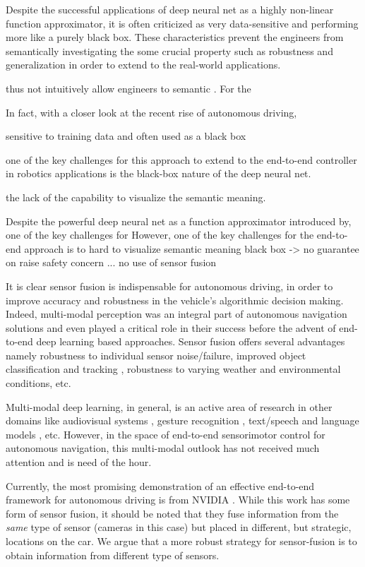 \documentclass[../thesis.tex]{subfiles}
\begin{document}
Despite the successful applications of deep neural net as a highly non-linear function approximator, it is often criticized as very data-sensitive and performing more like a purely black box. These characteristics prevent the engineers from semantically investigating the some crucial property such as robustness and generalization in order to extend 
to the real-world applications.


thus not intuitively allow engineers to semantic 
. For the 

In fact, with a closer look at the recent rise of autonomous driving, 

sensitive to training data and often used as a black box 

one of the key challenges for this approach to extend to the end-to-end controller in robotics applications is the black-box nature of the deep neural net.

the lack of the capability to visualize the semantic meaning. 

Despite the powerful deep neural net as a function approximator introduced by, one of the key challenges for 
However, one of the key challenges for the end-to-end approach is to 
hard to visualize semantic meaning 
black box -> no guarantee on 
raise safety concern ... 
no use of sensor fusion

It is clear sensor fusion is indispensable for autonomous driving, in order to improve accuracy and robustness in the vehicle's algorithmic decision making. Indeed, multi-modal perception was an integral part of autonomous navigation solutions and even played a critical role in their success \cite{multimodaltartan} before the advent of end-to-end deep learning based approaches. Sensor fusion offers several advantages namely robustness to individual sensor noise/failure, improved object classification and tracking \cite{elfring2016multisensor, cho2014multi, darms2008classification}, robustness to varying weather and environmental conditions, etc. 

Multi-modal deep learning, in general, is an active area of research in other domains like audiovisual systems \cite{ngmultimodal}, gesture recognition \cite{moddrop}, text/speech and language models \cite{languagemultimodal,srivastava2012multimodal}, etc. However, in the space of end-to-end sensorimotor control for autonomous navigation, this multi-modal outlook has not received much attention and is need of the hour.

Currently, the most promising demonstration of an effective end-to-end framework for autonomous driving is from NVIDIA \cite{nvidiacar}. While this work has some form of sensor fusion, it should be noted that they fuse information from the \textit{same} type of sensor (cameras in this case) but placed in different, but strategic, locations on the car. We argue that a more robust strategy for sensor-fusion is to obtain information from different type of sensors. 
\end{document}
